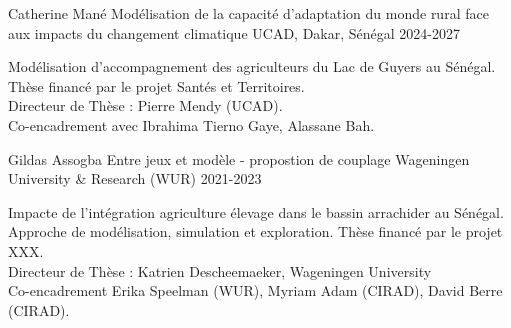 \vspace{2em}
\vspace{1em}
\begin{cventries}

    \cventry
      {Catherine Mané} %
      {Modélisation de la capacité d’adaptation du monde rural face
      aux impacts du changement climatique} %
      {UCAD, Dakar, Sénégal} %
      {2024-2027} %
      {
        \begin{cvitems} %
          Modélisation d'accompagnement des agriculteurs du Lac de Guyers au Sénégal. Thèse financé par le projet Santés et Territoires.\\
          Directeur de Thèse : Pierre Mendy (UCAD).\\
          Co-encadrement avec Ibrahima Tierno Gaye, Alassane Bah.
        \end{cvitems}
      }
    
    \cventry
      {Gildas Assogba} %
      {Entre jeux et modèle - propostion de couplage} %
      {Wageningen University \& Research (WUR)} %
      {2021-2023} %
      {
        \begin{cvitems} %
         Impacte de l'intégration agriculture élevage dans le bassin arrachider au Sénégal. Approche de modélisation, simulation et exploration. Thèse financé par le projet XXX.\\
         Directeur de Thèse : Katrien Descheemaeker, Wageningen University\\
         Co-encadrement Erika Speelman (WUR), Myriam Adam (CIRAD), David Berre (CIRAD).
        \end{cvitems}
      }  
\end{cventries}

